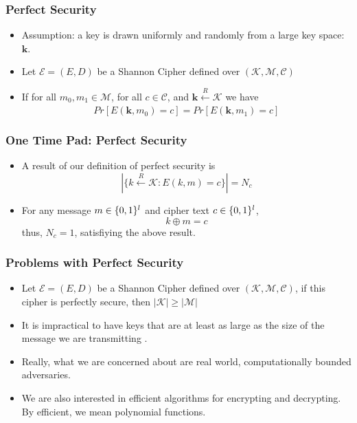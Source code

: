 \documentclass{beamer}
\begin{document}
\begin{frame}
\frametitle{Perfect Security}
\begin{itemize}
    \item Assumption: a key is drawn uniformly and randomly from a large key space: \(\textbf{k}\). \pause
    \item Let \(\mathcal{E} = (E, D)\) be a Shannon Cipher defined over \((\mathcal{K}, \mathcal{M}, \mathcal{C})\) \pause
    \item If for all \(m_0, m_1 \in \mathcal{M}\), for all \(c \in \mathcal{C}\), and \(\textbf{k} \xleftarrow[]{R} \mathcal{K}\) we have \[Pr[E(\textbf{k}, m_0) = c] = Pr[E(\textbf{k}, m_1) = c] \]
\end{itemize}
\end{frame}

\begin{frame}
\frametitle{One Time Pad: Perfect Security}
\begin{itemize}
    \item A result of our definition of perfect security is \[ | \{ k \xleftarrow[]{R} \mathcal{K}: E(k, m) = c \} | = N_c \] \pause
    \item For any message \(m \in \{0, 1\}^{\mathnormal{l}}\) and cipher text \(c \in \{0, 1\}^{\mathnormal{l}}\), \[ k \oplus m = c \] \pause thus, \(N_c = 1\), satisfiying the above result.
\end{itemize}
\end{frame}

\begin{frame}
\frametitle{Problems with Perfect Security}
\begin{itemize}
    \item Let \(\mathcal{E} = (E, D)\) be a Shannon Cipher defined over \((\mathcal{K}, \mathcal{M}, \mathcal{C})\), if this cipher is perfectly secure, then \(|\mathcal{K}| \geq |\mathcal{M}|\) \pause
    \item It is impractical to have keys that are at least as large as the size of the message we are transmitting . \pause
    \item Really, what we are concerned about are real world, computationally bounded adversaries. \pause
    \item We are also interested in efficient algorithms for encrypting and decrypting. By efficient, we mean polynomial functions.
\end{itemize}
\end{frame}
\end{document}

